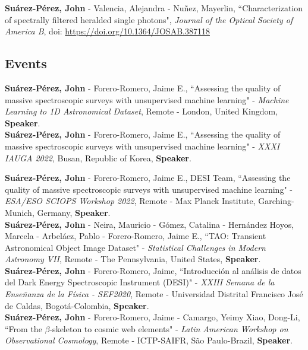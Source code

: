 \documentclass[10pt, a4paper]{article}
\newcommand{\years}[1]{\marginnote{\scriptsize #1}}
\begin{document}
\years{2020}\textbf{Suárez-Pérez, John} - Valencia, Alejandra - Nuñez, Mayerlin, “Characterization of spectrally filtered heralded single photons", \emph{Journal of the Optical Society of America B}, doi: \url{https://doi.org/10.1364/JOSAB.387118}




\subsection*{Events}
\noindent
\years{2023}\textbf{Suárez-Pérez, John} - Forero-Romero, Jaime E., “Assessing the quality of 
massive spectroscopic surveys with unsupervised machine learning" - \emph{Machine Learning to 1D 
Astronomical Dataset}, Remote - London, United Kingdom, \textbf{Speaker}.\\

\years{2022}\textbf{Suárez-Pérez, John} - Forero-Romero, Jaime E., “Assessing the quality of massive spectroscopic surveys with unsupervised machine learning" - \emph{XXXI IAUGA 2022},  Busan, Republic of Korea, \textbf{Speaker}.\\
\newpage

\years{2022}\textbf{Suárez-Pérez, John} - Forero-Romero, Jaime E., DESI Team, “Assessing the quality of massive spectroscopic surveys with unsupervised machine learning" - \emph{ESA/ESO SCIOPS Workshop 2022}, Remote - Max Planck Institute, Garching-Munich, Germany, \textbf{Speaker}.\\

\years{2021}\textbf{Suárez-Pérez, John} - Neira, Mauricio - Gómez, Catalina - Hernández Hoyos, Marcela - Arbeláez, Pablo - Forero-Romero, Jaime E., “TAO: Transient Astronomical Object Image Dataset" - \emph{Statistical Challenges in Modern Astronomy VII}, Remote - The Pennsylvania, United States, \textbf{Speaker}.\\ 

\years{2020}\textbf{Suárez-Pérez, John} - Forero-Romero, Jaime, “Introducción al análisis de datos del Dark Energy Spectroscopic Instrument (DESI)" - \emph{XXIII Semana de la Enseñanza de la Física - SEF2020}, Remote - Universidad Distrital Francisco José de Caldas, Bogotá-Colombia, \textbf{Speaker}.\\

\years{2020}\textbf{Suárez-Pérez, John} - Forero-Romero, Jaime - Camargo, Yeimy  Xiao, Dong-Li, “From the $\beta$-skeleton to cosmic web elements" - \emph{Latin American Workshop on Observational Cosmology}, Remote - ICTP-SAIFR, São Paulo-Brazil, \textbf{Speaker}.\\
\end{document}
